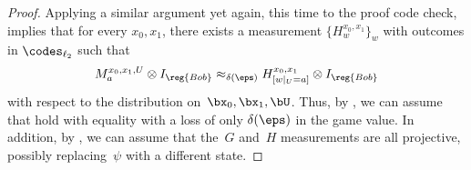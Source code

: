\begin{proof}
Applying a similar argument yet again, this time to the proof code check, implies that for every $x_0, x_1$,
there exists a measurement $\{H^{x_0, x_1}_w\}_w$ with outcomes in $\codes_{\ell_2}$ such that
\begin{equation}\label{eq:tweedledum}
M^{x_0, x_1, U}_a \otimes I_{\reg{Bob}} \approx_{\delta(\eps)} H^{x_0, x_1}_{[w|_{U} = a]} \otimes I_{\reg{Bob}}
\end{equation}
with respect to the distribution on~$\bx_0, \bx_1, \bU$.
Thus, by , we can assume that  hold with equality
with a loss of only $\delta(\eps)$ in the game value.
In addition, by , we can assume that the~$G$ and~$H$ measurements are all projective,
possibly replacing~$\psi$ with a different state.


\end{proof}
